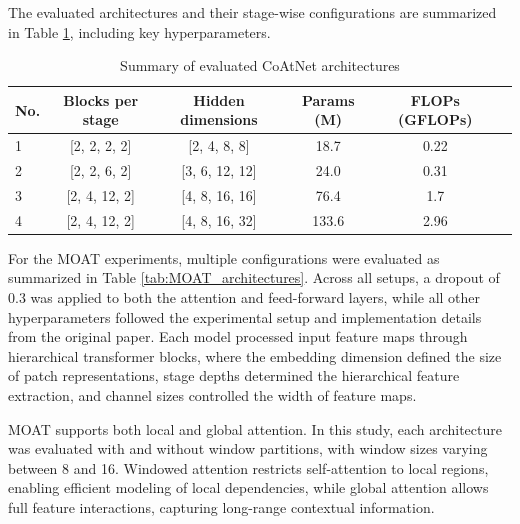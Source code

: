 \documentclass[a4paper,11pt,twoside]{report}
\theoremstyle{definition}
\begin{document}
The evaluated architectures and their stage-wise configurations are summarized in Table \ref{tab:coatnet_architectures}, including key hyperparameters.


\begin{table}[h!]
\centering
\caption{Summary of evaluated CoAtNet architectures}
\begin{adjustbox}{max width=\textwidth}
\begin{tabular}{lccccc}
\hline
\textbf{No.} & \textbf{Blocks per stage} & \textbf{Hidden dimensions} & \textbf{Params (M)} &
\textbf{FLOPs (GFLOPs)} \\
\hline
1 & [2, 2, 2, 2] & [2, 4, 8, 8] & 18.7 & 0.22 \\
2 & [2, 2, 6, 2] & [3, 6, 12, 12] & 24.0 & 0.31 \\
3 & [2, 4, 12, 2] & [4, 8, 16, 16] & 76.4 & 1.7 \\
4 & [2, 4, 12, 2] & [4, 8, 16, 32] & 133.6 & 2.96 \\
\hline
\end{tabular}
\label{tab:coatnet_architectures}
\end{adjustbox}
\end{table}

For the MOAT experiments, multiple configurations were evaluated as summarized in Table \ref{tab:MOAT_architectures}. Across all setups, a dropout of 0.3 was applied to both the attention and feed-forward layers, while all other hyperparameters followed the experimental setup and implementation details from the original paper. Each model processed input feature maps through hierarchical transformer blocks, where the embedding dimension defined the size of patch representations, stage depths determined the hierarchical feature extraction, and channel sizes controlled the width of feature maps.

MOAT supports both local and global attention. In this study, each architecture was evaluated with and without window partitions, with window sizes varying between 8 and 16. Windowed attention restricts self-attention to local regions, enabling efficient modeling of local dependencies, while global attention allows full feature interactions, capturing long-range contextual information.
\end{document}
